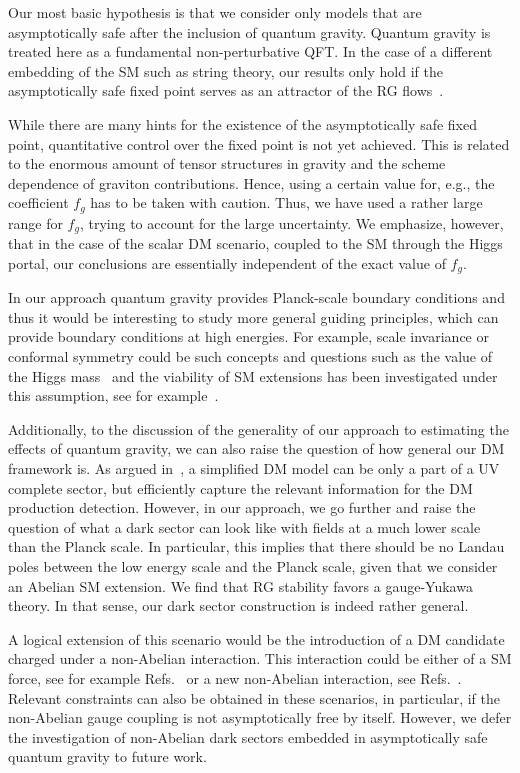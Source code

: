 \documentclass[aps,prd,twocolumn,preprintnumbers,superscriptaddress,nobibnotes,floatfix,longbibliography]{revtex4-1}
\begin{document}
Our most basic hypothesis is that we consider only models that are asymptotically safe after the inclusion of quantum gravity.
Quantum gravity is treated here as a fundamental non-perturbative QFT.
In the case of a different embedding of the SM such as string theory, our results only hold if the asymptotically safe fixed point serves as an attractor of the RG flows~\cite{1907.07894}.

While there are many hints for the existence of the asymptotically safe fixed point,
quantitative control over the fixed point is not yet achieved. 
This is related to the enormous amount of tensor structures in gravity 
and the scheme dependence of graviton contributions.
Hence, using a certain value for, e.g., the coefficient $f_g$ has to be taken with caution.
Thus, we have used a rather large range for $f_g$, trying to account for the large uncertainty.
We emphasize, however, that in the case of the scalar DM scenario, coupled to the SM through the Higgs portal, our conclusions are essentially independent of the exact value of $f_g$.

In our approach quantum gravity provides Planck-scale boundary conditions and thus it would be interesting to study more general guiding principles, which can provide boundary conditions at high energies. For example, scale invariance or conformal symmetry could be such concepts and questions such as the value of the Higgs mass~\cite{1112.2415} and the viability of SM extensions has been investigated under this assumption, see for example~\cite{1310.4423,1405.6204,1503.03066,1603.03603}.

Additionally, to the discussion of the generality of our approach to estimating the effects of quantum gravity, we can also raise the question of how general our DM framework is. As argued in~\cite{1506.03116}, a simplified DM model can be only a part of a UV complete sector, but efficiently capture the relevant information for the DM production detection. However, in our approach, we go further and raise the question of what a dark sector can look like with fields at a much lower scale than the Planck scale. In particular, this implies that there should be no Landau poles between the low energy scale and the Planck scale, given that we consider an Abelian SM extension. We find that RG stability favors a gauge-Yukawa theory. In that sense, our dark sector construction is indeed rather general. 

A logical extension of this scenario would be the introduction of a DM candidate charged under a non-Abelian interaction. This interaction could be either of a SM force, see for example Refs.~\cite{1801.01135,1904.11503} or a new non-Abelian interaction, see Refs.~\cite{1503.08749,1707.05380,1811.06975}. Relevant constraints can also be obtained in these scenarios, in particular, if the non-Abelian gauge coupling is not asymptotically free by itself. However, we defer the investigation of non-Abelian dark sectors embedded in asymptotically safe quantum gravity to future work. 
\end{document}
